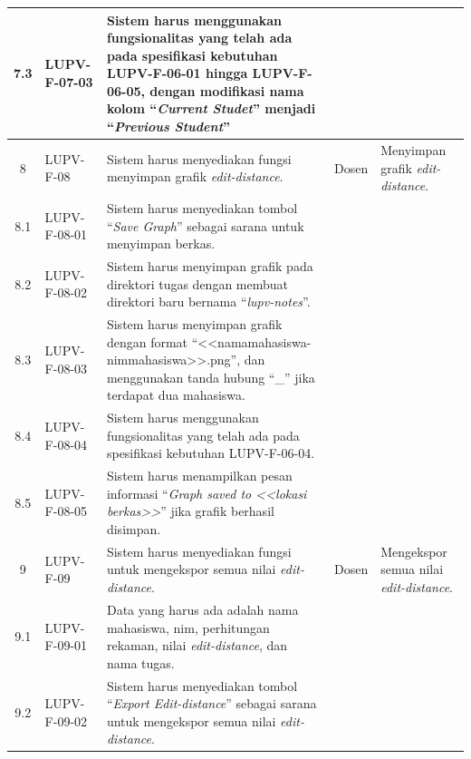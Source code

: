 {\begin{longtable}{|c|L{2.5cm}|L{5cm}|L{1.8cm}|L{2.1cm}|}
    7.3 & LUPV-F-07-03 & Sistem harus menggunakan fungsionalitas yang telah ada
                         pada spesifikasi kebutuhan LUPV-F-06-01 hingga
                         LUPV-F-06-05, dengan modifikasi nama kolom
                         ``\emph{Current Studet}'' menjadi
                         ``\emph{Previous Student}'' & &\\\hline
    8 & LUPV-F-08 & Sistem harus menyediakan fungsi menyimpan grafik
                    \emph{edit-distance}. & Dosen & Menyimpan grafik \emph{edit-distance}. \\
    8.1 & LUPV-F-08-01 & Sistem harus menyediakan tombol
                         ``\emph{Save Graph}'' sebagai sarana untuk
                         menyimpan berkas. & & \\
    8.2 & LUPV-F-08-02 & Sistem harus menyimpan grafik pada direktori
                         tugas dengan membuat direktori baru bernama
                         ``\emph{lupv-notes}''. & & \\
    8.3 & LUPV-F-08-03 & Sistem harus menyimpan grafik dengan format
                         ``<<namamahasiswa-nimmahasiswa>>.png'', dan
                         menggunakan tanda hubung ``\_'' jika
                         terdapat dua mahasiswa. & & \\
    8.4 & LUPV-F-08-04 & Sistem harus menggunakan fungsionalitas yang telah ada
                         pada spesifikasi kebutuhan LUPV-F-06-04. & & \\
    8.5 & LUPV-F-08-05 & Sistem harus menampilkan pesan informasi ``\emph{Graph saved to
                         <<lokasi berkas>>}'' jika grafik berhasil disimpan. & & \\\hline
    9 & LUPV-F-09 & Sistem harus menyediakan fungsi untuk mengekspor
                    semua nilai \emph{edit-distance}. & Dosen & Mengekspor semua
                                                                nilai \emph{edit-distance}.
    \\
    9.1 & LUPV-F-09-01 & Data yang harus ada adalah nama mahasiswa,
                         nim, perhitungan rekaman, nilai
                         \emph{edit-distance}, dan nama
                         tugas. & &\\
    9.2 & LUPV-F-09-02 & Sistem harus menyediakan tombol ``\emph{Export
                         Edit-distance}'' sebagai sarana untuk mengekspor semua nilai
                         \emph{edit-distance}. & & \\

\end{longtable}}

